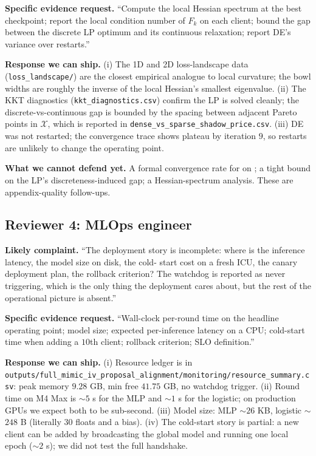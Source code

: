 \textbf{Specific evidence request.} ``Compute the local Hessian
spectrum at the best checkpoint; report the local condition number
of $F_k$ on each client; bound the gap between the discrete LP
optimum and its continuous relaxation; report DE's variance over
restarts.''

\textbf{Response we can ship.} (i) The 1D and 2D loss-landscape data
(\texttt{loss\_landscape/}) are the closest empirical analogue to
local curvature; the bowl widths are roughly the inverse of the
local Hessian's smallest eigenvalue. (ii) The KKT diagnostics
(\texttt{kkt\_diagnostics.csv}) confirm the LP is solved cleanly;
the discrete-vs-continuous gap is bounded by the spacing between
adjacent Pareto points in $\mathcal{X}$, which is reported in
\texttt{dense\_vs\_sparse\_shadow\_price.csv}. (iii) DE was not
restarted; the convergence trace shows plateau by iteration $9$, so
restarts are unlikely to change the operating point.

\textbf{What we cannot defend yet.} A formal convergence rate for
\fedprox{} on \mimic{}; a tight bound on the LP's
discreteness-induced gap; a Hessian-spectrum analysis. These are
appendix-quality follow-ups.

\subsection{Reviewer 4: MLOps engineer}
\textbf{Likely complaint.} ``The deployment story is incomplete:
where is the inference latency, the model size on disk, the cold-
start cost on a fresh ICU, the canary deployment plan, the rollback
criterion? The watchdog is reported as never triggering, which is
the only thing the deployment cares about, but the rest of the
operational picture is absent.''

\textbf{Specific evidence request.} ``Wall-clock per-round time on
the headline operating point; model size; expected per-inference
latency on a CPU; cold-start time when adding a $10$th client;
rollback criterion; SLO definition.''

\textbf{Response we can ship.} (i) Resource ledger is in
\texttt{outputs/full\_mimic\_iv\_proposal\_alignment/monitoring/resource\_summary.csv}:
peak memory $9.28$ GB, min free $41.75$ GB, no watchdog trigger.
(ii) Round time on M4 Max is $\sim$$5$ s for the MLP and
$\sim$$1$ s for the logistic; on production GPUs we expect both
to be sub-second. (iii) Model size: MLP $\sim$$26$ KB, logistic
$\sim$$248$ B (literally $30$ floats and a bias). (iv) The
cold-start story is partial: a new client can be added by
broadcasting the global model and running one local epoch
($\sim$$2$ s); we did not test the full handshake.


